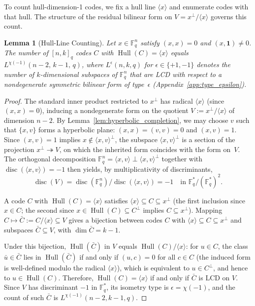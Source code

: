 \documentclass[11pt]{article}
\newcommand{\FF}{\mathbb{F}}
\newcommand{\0}{\mathbf{0}}
\newcommand{\1}{\mathbf{1}}
\DeclareMathOperator{\Hull}{Hull}
\DeclareMathOperator{\disc}{disc}
\theoremstyle{plain}
\newtheorem{lemma}[theorem]{Lemma}
\theoremstyle{definition}
\theoremstyle{remark}
\begin{document}
To count hull-dimension-1 codes, we fix a hull line $\langle x \rangle$ and enumerate codes with that hull. The structure of the residual bilinear form on $V = x^\perp / \langle x \rangle$ governs this count.

\begin{lemma}[Hull-Line Counting]\label{lem:hull_line_count}
Let $x \in \FF_q^n$ satisfy $(x,x) = 0$ and $(x,\1) \neq 0$. The number of $[n,k]_q$ codes $C$ with $\Hull(C) = \langle x \rangle$ equals $L^{\chi(-1)}(n-2,\, k-1,\, q)$, where $L^\epsilon(n,k,q)$ for $\epsilon \in \{+1, -1\}$ denotes the number of $k$-dimensional subspaces of $\FF_q^n$ that are LCD with respect to a nondegenerate symmetric bilinear form of type~$\epsilon$ (Appendix~\ref{app:type_epsilon}).
\end{lemma}
\begin{proof}
The standard inner product restricted to $x^\perp$ has radical $\langle x \rangle$ (since $(x,x)=0$), inducing a nondegenerate form on the quotient $V := x^\perp / \langle x \rangle$ of dimension $n - 2$. By Lemma~\ref{lem:hyperbolic_completion}, we may choose $v$ such that $\{x, v\}$ forms a hyperbolic plane: $(x, x) = (v, v) = 0$ and $(x, v) = 1$. Since $(x, v) = 1$ implies $x \notin \langle x, v\rangle^\perp$, the subspace $\langle x, v\rangle^\perp$ is a section of the projection $x^\perp \twoheadrightarrow V$, on which the inherited form coincides with the form on~$V$. The orthogonal decomposition $\FF_q^n = \langle x, v\rangle \perp \langle x, v\rangle^\perp$ together with $\disc(\langle x, v\rangle) = -1$ then yields, by multiplicativity of discriminants,
\[
\disc(V) = \disc(\FF_q^n)/\disc(\langle x, v \rangle) = -1 \quad \text{in } \FF_q^*/(\FF_q^*)^2.
\]

A code $C$ with $\Hull(C) = \langle x \rangle$ satisfies $\langle x \rangle \subseteq C \subseteq x^\perp$ (the first inclusion since $x \in C$; the second since $x \in \Hull(C) \subseteq C^\perp$ implies $C \subseteq x^\perp$). Mapping $C \mapsto \bar C := C/\langle x \rangle \subseteq V$ gives a bijection between codes $C$ with $\langle x \rangle \subseteq C \subseteq x^\perp$ and subspaces $\bar C \subseteq V$, with $\dim \bar C = k - 1$.

Under this bijection, $\Hull(\bar C)$ in $V$ equals $\Hull(C)/\langle x \rangle$: for $u \in C$, the class $\bar u \in \bar C$ lies in $\Hull(\bar C)$ if and only if $(u, c) = 0$ for all $c \in C$ (the induced form is well-defined modulo the radical $\langle x \rangle$), which is equivalent to $u \in C^\perp$, and hence to $u \in \Hull(C)$. Therefore, $\Hull(C) = \langle x \rangle$ if and only if $\bar C$ is LCD on $V$. Since $V$ has discriminant $-1$ in $\FF_q^*$, its isometry type is $\epsilon = \chi(-1)$, and the count of such $\bar C$ is $L^{\chi(-1)}(n-2, k-1, q)$.
\end{proof}
\end{document}
